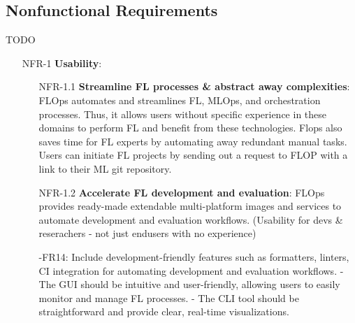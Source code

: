 \subsection{Nonfunctional Requirements}
TODO

\begin{itemize}
    \item [NFR-1] {\textbf{Usability}}:
        \begin{itemize}
        \item [NFR-1.1] \textbf{Streamline FL processes \& abstract away complexities}:
            FLOps automates and streamlines FL, MLOps, and orchestration processes.
            Thus, it allows users without specific experience in these domains to perform FL and benefit from these technologies.
            Flops also saves time for FL experts by automating away redundant manual tasks.
            Users can initiate FL projects by sending out a request to FLOP with a link to their ML git repository.
        \item [NFR-1.2] \textbf{Accelerate FL development and evaluation}: 
            FLOps provides ready-made extendable multi-platform images and services to automate development and evaluation workflows.    
            (Usability for devs \& reserachers - not just endusers with no experience)
            
            -FR14: Include development-friendly features such as formatters, linters, CI integration for automating development and evaluation workflows.
            - The GUI should be intuitive and user-friendly, allowing users to easily monitor and manage FL processes.
            - The CLI tool should be straightforward and provide clear, real-time visualizations.


\end{itemize}
\end{itemize}
